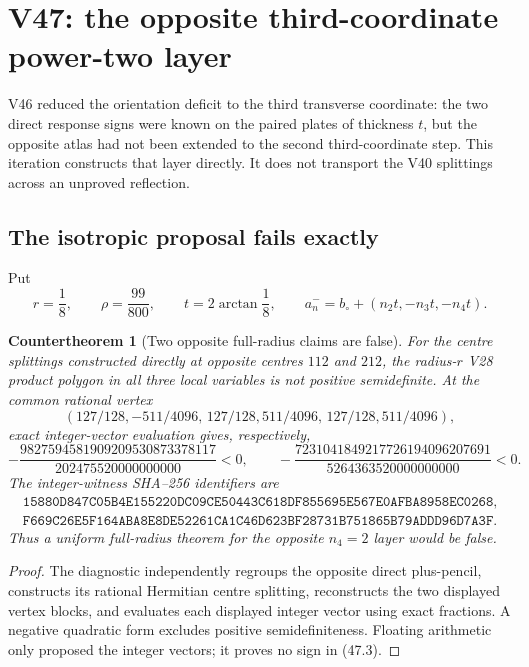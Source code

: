 \documentclass[11pt,oneside]{article}
\newtheorem{countertheorem}[theorem]{Countertheorem}
\theoremstyle{definition}
\theoremstyle{remark}
\begin{document}
\section{V47: the opposite third-coordinate power-two layer}
\label{sec:newv47-opposite-third-layer}

V46 reduced the orientation deficit to the third transverse
coordinate: the two direct response signs were known on the paired
plates of thickness \(t\), but the opposite atlas had not been
extended to the second third-coordinate step.  This iteration
constructs that layer directly.  It does not transport the V40
splittings across an unproved reflection.

\subsection{The isotropic proposal fails exactly}

Put
\[
 r=\frac18,\qquad \rho=\frac{99}{800},\qquad
 t=2\arctan\frac18,\qquad
 a_n^-=b_\circ+(n_2t,-n_3t,-n_4t).                    \tag{47.1}
\]

\begin{countertheorem}[Two opposite full-radius claims are false]
\label{cth:newv47-isotropic-failure}
For the centre splittings constructed directly at opposite centres
\(112\) and \(212\), the radius-\(r\) V28 product polygon in all
three local variables is not positive semidefinite.  At the common
rational vertex
\[
 (127/128,-511/4096,\,
  127/128,511/4096,\,
  127/128,511/4096),                                   \tag{47.2}
\]
exact integer-vector evaluation gives, respectively,
\[
 -\frac{9827594581909209530873378117}
        {202475520000000000}<0,\qquad
 -\frac{7231041849217726194096207691}
        {5264363520000000000}<0.                       \tag{47.3}
\]
The integer-witness SHA--256 identifiers are
\[
\begin{gathered}
\texttt{15880D847C05B4E155220DC09CE50443C618DF855695E567E0AFBA8958EC0268},\\
\texttt{F669C26E5F164ABA8E8DE52261CA1C46D623BF28731B751865B79ADDD96D7A3F}.
\end{gathered}                                         \tag{47.4}
\]
Thus a uniform full-radius theorem for the opposite \(n_4=2\)
layer would be false.
\end{countertheorem}

\begin{proof}
The diagnostic independently regroups the opposite direct
plus-pencil, constructs its rational Hermitian centre splitting,
reconstructs the two displayed vertex blocks, and evaluates each
displayed integer vector using exact fractions.  A negative
quadratic form excludes positive semidefiniteness.  Floating
arithmetic only proposed the integer vectors; it proves no sign in
(47.3).
\end{proof}
\end{document}
